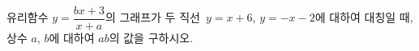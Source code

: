 유리함수 $y=\dfrac{bx+3}{x+a}$의 그래프가 두 직선~$y=x+6$, $y=-x-2$에 대하여 대칭일 때, 상수 $a$, $b$에 대하여 $ab$의 값을 구하시오.
